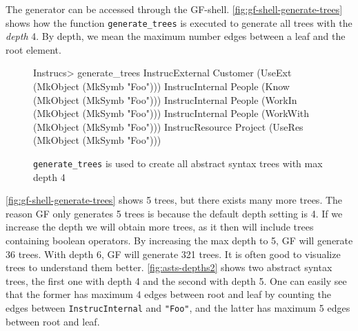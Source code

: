 The generator can be accessed through the GF-shell. \autoref{fig:gf-shell-generate-trees} shows how the function \texttt{generate\_trees} is executed to generate all trees with the \emph{depth} 4. By depth, we mean the maximum number edges between a leaf and the root element.

\begin{figure}[H]
\begin{terminal}
Instrucs> generate_trees
InstrucExternal Customer (UseExt (MkObject (MkSymb "Foo")))
InstrucInternal People (Know (MkObject (MkSymb "Foo")))
InstrucInternal People (WorkIn (MkObject (MkSymb "Foo")))
InstrucInternal People (WorkWith (MkObject (MkSymb "Foo")))
InstrucResource Project (UseRes (MkObject (MkSymb "Foo")))
\end{terminal}
\caption{\texttt{generate\_trees} is used to create all abstract syntax trees with max depth 4\label{fig:gf-shell-generate-trees}}
\end{figure}

\autoref{fig:gf-shell-generate-trees} shows 5 trees, but there exists many more trees. The reason GF only generates 5 trees is because the default depth setting is 4. If we increase the depth we will obtain more trees, as it then will include trees containing boolean operators. By increasing the max depth to 5, GF will generate 36 trees. With depth 6, GF will generate 321 trees.
\newline
\newline
It is often good to visualize trees to understand them better. \autoref{fig:asts-depths2} shows two abstract syntax trees, the first one with depth 4 and the second with depth 5. One can easily see that the former has maximum 4 edges between root and leaf by counting the edges between \texttt{InstrucInternal} and \texttt{"Foo"}, and the latter has maximum 5 edges between root and leaf.

